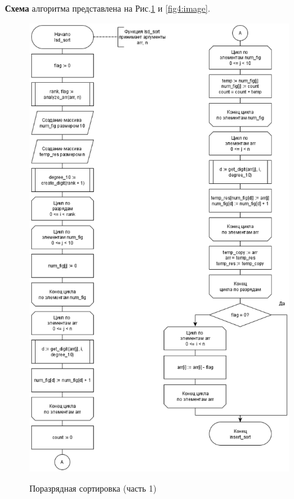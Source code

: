 \textbf{Схема} алгоритма представлена на Рис.\ref{fig3:image} и \ref{fig4:image}.
\begin{figure}[pt!]
	\begin{center}
		{\includegraphics[scale = 0.55]{schemes/lsd_1}}
		\caption{Поразрядная сортировка (часть 1)}
		\label{fig3:image}
	\end{center}
\end{figure}

